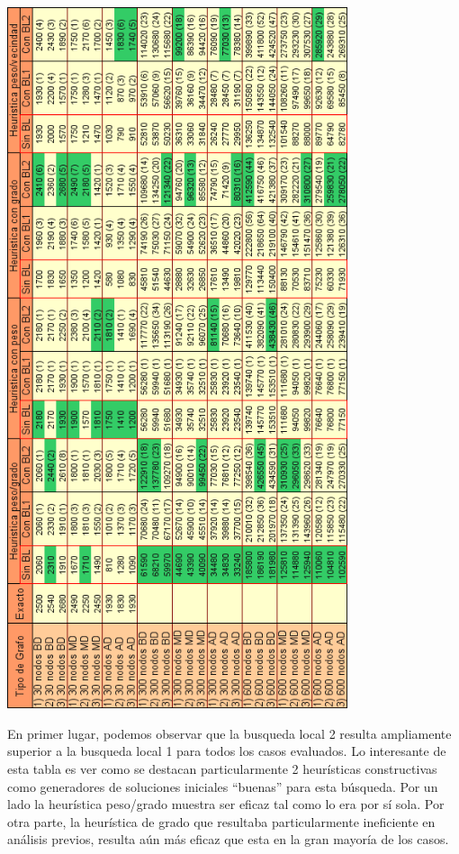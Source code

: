 \documentclass[a4paper,11pt] {article}
\begin{document}
\begin{center}
 \includegraphics[width=0.75\textwidth]{tablas/tablaHCBL.png}
\end{center}

En primer lugar, podemos observar que la busqueda local 2 resulta ampliamente superior a la busqueda local 1 para todos los casos evaluados. Lo interesante de esta tabla es ver como se destacan particularmente 2 heurísticas constructivas como generadores de soluciones iniciales ``buenas'' para esta búsqueda. Por un lado la heurística peso/grado muestra ser eficaz tal como lo era por sí sola. Por otra parte, la heurística de grado que resultaba particularmente ineficiente en análisis previos, resulta aún más eficaz que esta en la gran mayoría de los casos.
\end{document}
